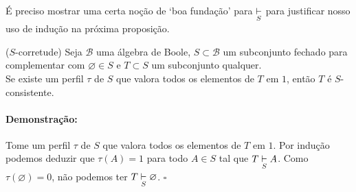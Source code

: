\documentclass[11pt]{article}
\newcommand{\pulinho}{\vspace{.5cm}}
\theoremstyle{definition}
\theoremstyle{definition}
\theoremstyle{definition}
\theoremstyle{definition}
\newtheorem*{prop*}{Proposição}
\newenvironment{proposicao*}{
\definecolor{shadecolor}{HTML}{FFDBDF}
\begin{shaded}
\begin{prop*}
}
{
\end{prop*}
\end{shaded}
}
\theoremstyle{definition}
\theoremstyle{definition}
\theoremstyle{definition}
\theoremstyle{definition}
\theoremstyle{definition}
\theoremstyle{definition}
\newtheorem*{example*}{Exemplo}
\newenvironment{exemplo*}{
\definecolor{shadecolor}{HTML}{b9e6d3}
\begin{shaded}
\begin{example*}
}
{
\end{example*}
\end{shaded}
}
\theoremstyle{definition}
\theoremstyle{definition}
\newenvironment{prova}{\paragraph{Demonstração:}}{\hfill$\square$ 
\pulinho
}
\theoremstyle{definition}
\theoremstyle{definition}
\begin{document}
É preciso mostrar uma certa noção de `boa fundação' para $\underset{S}{\vdash}$ para justificar nosso uso de indução na próxima proposição.

\begin{proposicao*}($S$-corretude)
  Seja $\mathcal{B}$ uma álgebra de Boole, $S \subset \mathcal{B}$ um subconjunto fechado para complementar com $\varnothing \in S$ e $T \subset S$ um subconjunto qualquer. \\

  Se existe um perfil $\tau$ de $S$ que valora todos os elementos de $T$ em $1$, então $T$ é $S$-consistente.
\end{proposicao*}

\begin{prova}
  Tome um perfil $\tau$ de $S$ que valora todos os elementos de $T$ em $1$. Por indução podemos deduzir que $\tau(A) = 1$ para todo $A \in S$ tal que $T \underset{S}{\vdash} A$. Como $\tau(\varnothing) = 0$, não podemos ter $T \underset{S}{\vdash} \varnothing$.
\end{prova}






\end{document}
